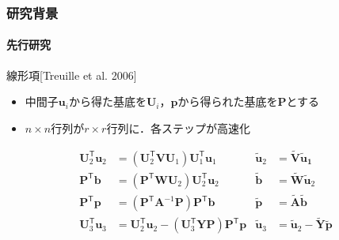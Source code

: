 \documentclass[aspectratio=169,dvipdfmx,hyperref={bookmarks=true}]{beamer}
\begin{document}
\begin{frame}
\frametitle{研究背景}
\framesubtitle{先行研究}
	\begin{block}{線形項[Treuille et al. 2006]}
	   \begin{itemize}
   	\item 中間子$\bm{u}_i$から得た基底を$\bm{U}_i$，$\bm{p}$から得られた基底を$\bm{P}$とする
	\item $n\times n$行列が$r \times r$行列に．各ステップが高速化
	\end{itemize}
\begin{align*}
 \bm{U}_2^{\mathsf T}\bm{u}_2	& = (\bm{U}_2^{\mathsf T}\bm{V}\bm{U}_1)\bm{U}_1^{\mathsf T}\bm{u}_1 					&\bm{\widetilde{u}}_2 		&= \bm{\widetilde{V}}\bm{\widetilde{u}_1}	\\
 \bm{P}^{\mathsf T}\bm{b}		& = (\bm{P}^{\mathsf T}\bm{W}\bm{U}_2)\bm{U}_2^{\mathsf T}\bm{u}_2        				&\bm{\widetilde{b}}			&= \bm{\widetilde{W}}\bm{\widetilde{u}}_2	\\
 \bm{P}^{\mathsf T}\bm{p} 		&= (\bm{P}^{\mathsf T}\bm{A}^{-1}\bm{P})\bm{P}^{\mathsf T}\bm{b}						&\bm{\widetilde{p}}			&= \bm{\widetilde{A}}\bm{\widetilde{b}}\\
 \bm{U}_3^{\mathsf T}\bm{u}_3 	&=  \bm{U}_2^{\mathsf T}\bm{u}_2 - (\bm{U}_3^{\mathsf T}\bm{Y}\bm{P})\bm{P}^{\mathsf T}\bm{p}	&\bm{\widetilde{u}}_3		&= \bm{\widetilde{u}}_2  -  \bm{\widetilde{Y}}\bm{\widetilde{p}}
\end{align*}
\end{block}

\end{frame}

\end{document}
